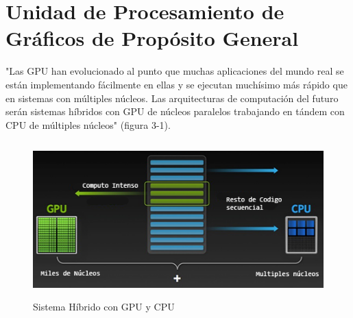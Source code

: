 \chapter{Unidad de Procesamiento de Gráficos de Propósito General}
"Las GPU han evolucionado al punto que muchas aplicaciones del mundo real se están implementando fácilmente en ellas y se ejecutan muchísimo más rápido que en sistemas con múltiples núcleos. Las arquitecturas de computación del futuro serán sistemas híbridos con GPU de núcleos paralelos trabajando en tándem con CPU de múltiples núcleos" (figura 3-1).\cite{GPUIntro}
\begin{figure}[H]
                      \centering
                              \includegraphics[height=6cm]{img/how-gpu-acceleration-works.png}
                      \caption{Sistema Híbrido con GPU y CPU}
\end{figure}
